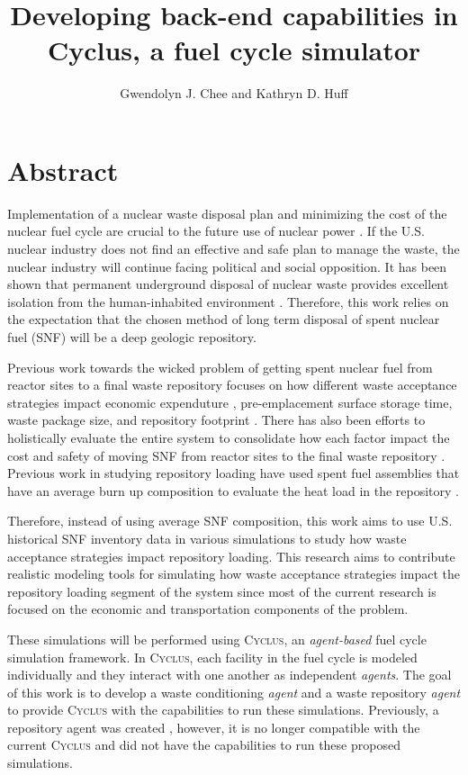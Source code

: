 \documentclass{anstrans}
\title{Developing back-end capabilities in Cyclus, a fuel cycle simulator}
\author{Gwendolyn J. Chee and Kathryn D. Huff}
\institute{
Dept. of Nuclear, Plasma and Radiological Engineering, University of Illinois at Urbana-Champaign \\
gchee2@illinois.edu
}
\begin{document}
\section{Abstract} 
Implementation of a nuclear waste disposal plan and minimizing the cost of the 
nuclear fuel cycle are crucial to the future use of nuclear power 
\cite{massachusetts_institute_of_technology_future_2003}. 
If the U.S. nuclear industry does not find an effective and safe plan to manage 
the waste, the nuclear industry will continue facing political and social 
opposition. 
It has been shown that permanent underground disposal of nuclear waste provides
excellent isolation from the human-inhabited environment 
\cite{rechard_evolution_2014}. 
Therefore, this work relies on the expectation that the chosen method of long 
term disposal of spent nuclear fuel (SNF) will be a deep geologic repository. 

Previous work towards the wicked problem of getting spent nuclear fuel from reactor 
sites to a final waste repository focuses on how different waste acceptance strategies 
impact economic expenduture \cite{nesbit_proposed_2015}, pre-emplacement 
surface storage time, waste package size, and repository 
footprint \cite{greenberg_application_2012}. 
There has also been efforts to holistically evaluate the entire system to consolidate 
how each factor impact the cost and safety of moving SNF from 
reactor sites to the final waste repository \cite{nutt_waste_2015}.
Previous work in studying repository loading have used spent fuel assemblies 
that have an average burn up composition \cite{johnson_optimizing_2016} 
to evaluate the heat load in the repository \cite{greenberg_application_2012}. 

Therefore, instead of using average SNF composition, this work aims to use U.S. 
historical SNF inventory data \cite{peterson_unf_standards_2017} in various 
simulations to study how waste acceptance strategies impact repository loading. 
This research aims to contribute realistic modeling tools for simulating how 
waste acceptance strategies impact the repository loading segment of the 
system since most of the current research is focused on the economic and 
transportation components of the problem. 

These simulations will be performed using \textsc{Cyclus}, an 
\textit{agent-based} fuel cycle simulation framework. 
In \textsc{Cyclus}, each facility in the fuel cycle is modeled individually 
and they interact with one another as independent \textit{agents}. 
The goal of this work is to develop a waste conditioning \textit{agent} 
and a waste repository \textit{agent} to provide \textsc{Cyclus} with 
the capabilities to run these simulations. 
Previously, a repository agent was created \cite{huff_cyclus_2013}, however, 
it is no longer compatible with the current \textsc{Cyclus} and 
did not have the capabilities to run these proposed simulations.  
 
\end{document}

